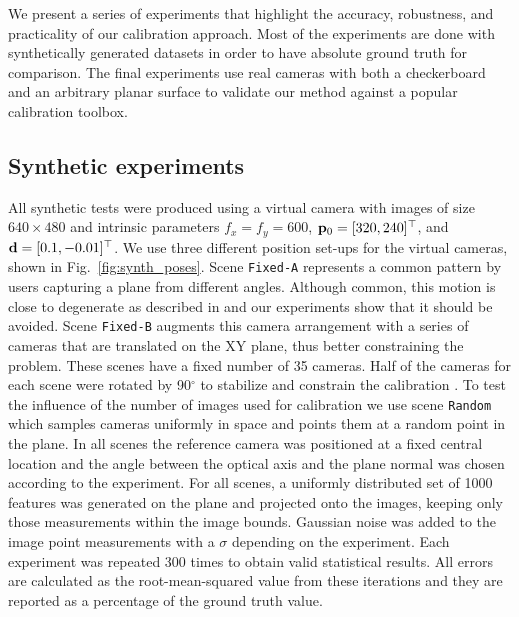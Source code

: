\documentclass[10pt,twocolumn,letterpaper]{article}
\begin{document}
We present a series of experiments that highlight the accuracy, robustness, and practicality of our calibration approach. Most of the experiments are done with synthetically generated datasets in order to have absolute ground truth for comparison. The final experiments use real cameras with both a checkerboard and an arbitrary planar surface to validate our method against a popular calibration toolbox.

\subsection{Synthetic experiments}

All synthetic tests were produced using a virtual camera with images of size $640 \times 480$ and intrinsic parameters $f_x=f_y=600$, $\mathbf{p}_0=[320,240]^\top$, and $\mathbf{d}=[0.1,-0.01]^\top$. We use three different position set-ups for the virtual cameras, shown in Fig.~\ref{fig:synth_poses}. Scene \texttt{Fixed-A} represents a common pattern by users capturing a plane from different angles. Although common, this motion is close to degenerate as described in \cite{sturm1997} and our experiments show that it should be avoided. Scene \texttt{Fixed-B} augments this camera arrangement with a series of cameras that are translated on the XY plane, thus better constraining the problem. These scenes have a fixed number of 35 cameras. Half of the cameras for each scene were rotated by 90$^\circ$ to stabilize and constrain the calibration \cite{remondino2006}. To test the influence of the number of images used for calibration we use scene \texttt{Random} which samples cameras uniformly in space and points them at a random point in the plane. In all scenes the reference camera was positioned at a fixed central location and the angle between the optical axis and the plane normal was chosen according to the experiment. For all scenes, a uniformly distributed set of 1000 features was generated on the plane and projected onto the images, keeping only those measurements within the image bounds. Gaussian noise was added to the image point measurements with a $\sigma$ depending on the experiment. Each experiment was repeated 300 times to obtain valid statistical results. All errors are calculated as the root-mean-squared value from these iterations and they are reported as a percentage of the ground truth value.
\end{document}
